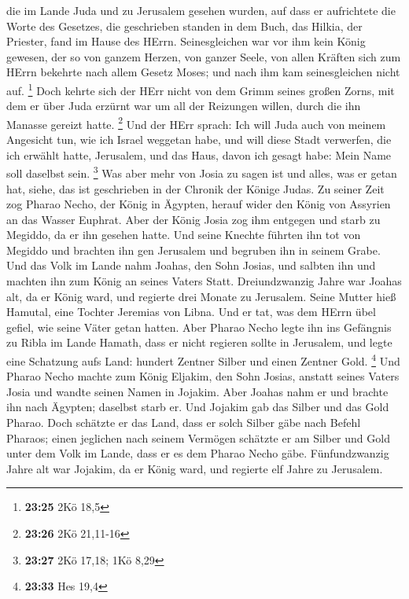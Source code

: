 die im Lande Juda und zu Jerusalem gesehen wurden, auf dass er
aufrichtete die Worte des Gesetzes, die geschrieben standen in dem Buch,
das Hilkia, der Priester, fand im Hause des HErrn. 
Seinesgleichen war vor ihm kein König gewesen, der so von ganzem Herzen,
von ganzer Seele, von allen Kräften sich zum HErrn bekehrte nach allem
Gesetz Moses; und nach ihm kam seinesgleichen nicht auf. \footnote{\textbf{23:25}
  2Kö 18,5}  Doch kehrte sich der HErr nicht von dem Grimm
seines großen Zorns, mit dem er über Juda erzürnt war um all der
Reizungen willen, durch die ihn Manasse gereizt hatte. \footnote{\textbf{23:26}
  2Kö 21,11-16}  Und der HErr sprach: Ich will Juda auch
von meinem Angesicht tun, wie ich Israel weggetan habe, und will diese
Stadt verwerfen, die ich erwählt hatte, Jerusalem, und das Haus, davon
ich gesagt habe: Mein Name soll daselbst sein. \footnote{\textbf{23:27}
  2Kö 17,18; 1Kö 8,29}  Was aber mehr von Josia zu sagen
ist und alles, was er getan hat, siehe, das ist geschrieben in der
Chronik der Könige Judas.  Zu seiner Zeit zog Pharao Necho,
der König in Ägypten, herauf wider den König von Assyrien an das Wasser
Euphrat. Aber der König Josia zog ihm entgegen und starb zu Megiddo, da
er ihn gesehen hatte.  Und seine Knechte führten ihn tot
von Megiddo und brachten ihn gen Jerusalem und begruben ihn in seinem
Grabe. Und das Volk im Lande nahm Joahas, den Sohn Josias, und salbten
ihn und machten ihn zum König an seines Vaters Statt. 
Dreiundzwanzig Jahre war Joahas alt, da er König ward, und regierte drei
Monate zu Jerusalem. Seine Mutter hieß Hamutal, eine Tochter Jeremias
von Libna.  Und er tat, was dem HErrn übel gefiel, wie
seine Väter getan hatten.  Aber Pharao Necho legte ihn ins
Gefängnis zu Ribla im Lande Hamath, dass er nicht regieren sollte in
Jerusalem, und legte eine Schatzung aufs Land: hundert Zentner Silber
und einen Zentner Gold. \footnote{\textbf{23:33} Hes 19,4} 
Und Pharao Necho machte zum König Eljakim, den Sohn Josias, anstatt
seines Vaters Josia und wandte seinen Namen in Jojakim. Aber Joahas nahm
er und brachte ihn nach Ägypten; daselbst starb er.  Und
Jojakim gab das Silber und das Gold Pharao. Doch schätzte er das Land,
dass er solch Silber gäbe nach Befehl Pharaos; einen jeglichen nach
seinem Vermögen schätzte er am Silber und Gold unter dem Volk im Lande,
dass er es dem Pharao Necho gäbe.  Fünfundzwanzig Jahre alt
war Jojakim, da er König ward, und regierte elf Jahre zu Jerusalem.
